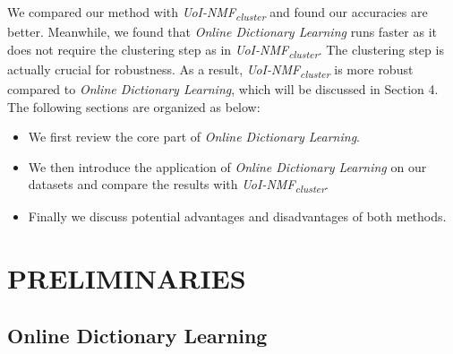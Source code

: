 \documentclass[conference]{IEEEtran}
\begin{document}
We compared our method with \textit{UoI-NMF\textsubscript{cluster}} \cite{b5} and found our accuracies are better. Meanwhile, we found that \textit{Online Dictionary Learning} runs faster as it does not require the clustering step as in \textit{UoI-NMF\textsubscript{cluster}}. The clustering step is actually crucial for robustness. As a result, \textit{UoI-NMF\textsubscript{cluster}} is more robust compared to \textit{Online Dictionary Learning}, which will be discussed in Section 4. The following sections are organized as below:

\begin{itemize}
\item We first review the core part of \textit{Online Dictionary Learning}.
\item We then introduce the application of \textit{Online Dictionary Learning} on our datasets and compare the results with \textit{UoI-NMF\textsubscript{cluster}}.
\item Finally we discuss potential advantages and disadvantages of both methods.
\end{itemize}

\section{PRELIMINARIES}
\subsection{Online Dictionary Learning}
\end{document}
